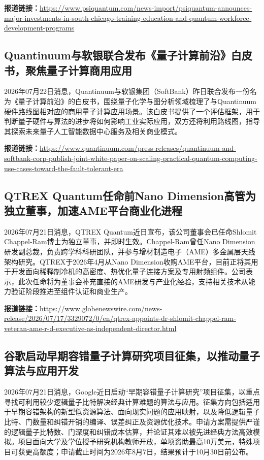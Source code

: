 \documentclass[12pt,a4paper]{ctexart}
\begin{document}
\noindent\textbf{报道链接：}\url{https://www.psiquantum.com/news-import/psiquantum-announces-major-investments-in-south-chicago-training-education-and-quantum-workforce-development-programs}

\subsection{ Quantinuum与软银联合发布《量子计算前沿》白皮书，聚焦量子计算商用应用 }

2026年07月22日消息，Quantinuum与软银集团（SoftBank）昨日联合发布一份名为《量子计算前沿》的白皮书，围绕量子化学与图分析领域梳理了与Quantinuum硬件路线图相对应的商用量子计算应用场景。该白皮书提供了一个评估框架，用于判断量子硬件与算法的进步将如何影响工业实际应用，双方还将利用路线图，指导其探索未来量子人工智能数据中心服务及相关商业模式。

\noindent\textbf{报道链接：}\url{https://www.quantinuum.com/press-releases/quantinuum-and-softbank-corp-publish-joint-white-paper-on-scaling-practical-quantum-computing-use-cases-toward-the-fault-tolerant-era}

\subsection{ QTREX Quantum任命前Nano Dimension高管为独立董事，加速AME平台商业化进程 }

2026年07月21日消息，QTREX Quantum近日宣布，该公司董事会已任命Shlomit Chappel-Ram博士为独立董事，并即时生效。Chappel-Ram曾任Nano Dimension研发副总裁，负责跨学科科研团队，并参与增材制造电子（AME）多金属层天线架构研究。QTREX于2026年4月从Nano Dimension收购AME平台，目前正将其用于开发面向稀释制冷机的高密度、热优化量子连接方案及专用射频组件。公司表示，此次任命将为董事会补充直接的AME研发与产业化经验，支持相关技术从能力验证阶段推进至组件认证和商业生产。

\noindent\textbf{报道链接：}\url{https://www.globenewswire.com/news-release/2026/07/17/3329072/0/en/qtrex-appoints-dr-shlomit-chappel-ram-veteran-ame-r-d-executive-as-independent-director.html}

\subsection{ 谷歌启动早期容错量子计算研究项目征集，以推动量子算法与应用开发 }

2026年07月21日消息，Google近日启动“早期容错量子计算研究”项目征集，以重点寻找可利用较少逻辑量子比特解决经典计算难题的算法与应用。征集方向包括适用于早期容错架构的新型低资源算法、面向现实问题的应用映射，以及降低逻辑量子比特、门数量和纠错开销的编译、误差纠正及资源优化技术。申请方案需提供严谨的逻辑量子比特数、门深度和纠错成本估算，并论证其难以被先进经典方法高效模拟。项目面向大学及学位授予研究机构教师开放，单项资助最高10万美元，特殊项目可获更高额度；申请截止时间为2026年8月7日，结果预计于10月30日前公布。
\end{document}

